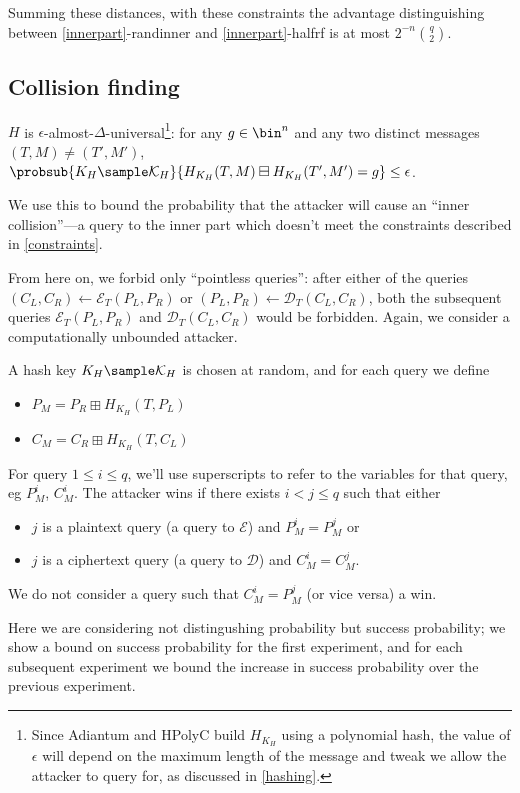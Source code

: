 \documentclass[journal=tosc,preprint,floatrow,submission]{iacrtrans}
\newcommand*{\xprm}[2]{\textsf{\ref*{#1}-#2}}
\newcommand*{\calE}{\mathcal{E}}
\newcommand*{\calD}{\mathcal{D}}
\begin{document}
Summing these distances, with these constraints the advantage distinguishing between
\xprm{innerpart}{randinner} and \xprm{innerpart}{halfrf} is at most
$2^{-n}\binom{q}{2}$.

\subsection{Collision finding}\label{collision}
$H$ is $\epsilon$-almost-$\Delta$-universal\footnote{Since Adiantum and HPolyC build $H_{K_H}$ using a polynomial hash, the value of $\epsilon$ will depend
on the maximum length of the message and tweak we allow the attacker to query for, as
discussed in \autoref{hashing}.}:
for any $g \in \bin^n$ and
any two distinct messages $(T, M) \neq (T', M')$,
$\probsub{K_H \sample \mathcal{K}_H}{H_{K_H}(T, M) \boxminus H_{K_H}(T', M') = g} \leq \epsilon$.

We use this to bound the probability that the attacker will cause an
``inner collision''---a query to the inner part which doesn't meet the constraints described
in \autoref{constraints}.

From here on, we forbid only ``pointless queries'': after either of the queries
$(C_L, C_R) \leftarrow \calE_T(P_L, P_R)$ or $(P_L, P_R) \leftarrow \calD_T(C_L, C_R)$,
both the subsequent queries
$\calE_T(P_L, P_R)$ and $\calD_T(C_L, C_R)$ would be forbidden. Again, we consider a
computationally unbounded attacker.

A hash key $K_H \sample \mathcal{K}_H$ is chosen at random, and for each query we define
\begin{itemize}
    \item $P_M = P_R \boxplus H_{K_H}(T, P_L)$
    \item $C_M = C_R \boxplus H_{K_H}(T, C_L)$
\end{itemize}

For query $1 \leq i \leq q$, we'll use superscripts to refer to the variables for that query, eg
$P_M^i$, $C_M^i$. The attacker wins if there exists $i < j \leq q$ such that
either
\begin{itemize}
    \item $j$ is a plaintext query (a query to $\calE$) and $P_M^i = P_M^j$ or
    \item $j$ is a ciphertext query (a query to $\calD$) and $C_M^i = C_M^j$.
\end{itemize}
We do not consider a query such that $C_M^i = P_M^j$ (or vice versa) a win.

Here we are considering not distingushing probability but success probability; we
show a bound on success probability for the first experiment, and for each subsequent experiment
we bound the increase in success probability over the previous experiment.
\end{document}
